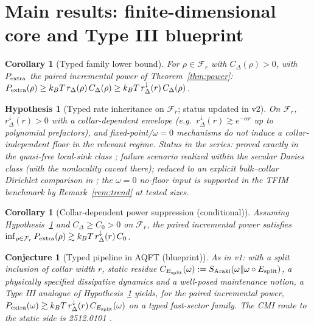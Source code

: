 \documentclass[11pt]{article}
\newtheorem{corollary}[theorem]{Corollary}
\newtheorem{hypothesis}[theorem]{Hypothesis}
\newtheorem{conjecture}[theorem]{Conjecture}
\theoremstyle{remark}
\begin{document}
\section{Main results: finite-dimensional core and Type III blueprint}
\begin{corollary}[Typed family lower bound]
For $\rho \in \mathcal{F}_r$ with $C_\Delta(\rho) > 0$, with
$P_{\rm extra}$ the \emph{paired} incremental power of
Theorem~\ref{thm:power}:
$P_{\rm extra}(\rho) \ge k_B T\, r_\Delta(\rho)\, C_\Delta(\rho) \ge
k_B T\, r^\downarrow_\Delta(r)\, C_\Delta(\rho)$.
\end{corollary}
\begin{hypothesis}[Typed rate inheritance on $\mathcal{F}_r$; status
updated in v2]
\label{hyp:rip}
On $\mathcal{F}_r$, $r^\downarrow_\Delta(r) > 0$ with a collar-dependent
envelope (e.g.\ $r^\downarrow_\Delta(r) \gtrsim e^{-\alpha r}$ up to
polynomial prefactors), and fixed-point/$\omega = 0$ mechanisms do not
induce a collar-independent floor in the relevant regime. \emph{Status in
the series:} proved exactly in the quasi-free local-sink class
\cite{S0064}; failure scenario realized within the secular Davies class
\cite{S0070} (with the nonlocality caveat there); reduced to an explicit
bulk--collar Dirichlet comparison in \cite{S0020}; the $\omega = 0$
no-floor input is supported in the TFIM benchmark by
Remark~\ref{rem:trend} at tested sizes.
\end{hypothesis}
\begin{corollary}[Collar-dependent power suppression (conditional)]
Assuming Hypothesis~\ref{hyp:rip} and $C_\Delta \ge C_0 > 0$ on
$\mathcal{F}_r$, the paired incremental power satisfies
$\inf_{\rho \in \mathcal{F}_r} P_{\rm extra}(\rho)
\gtrsim k_B T\, r^\downarrow_\Delta(r)\, C_0$.
\end{corollary}
\begin{conjecture}[Typed pipeline in AQFT (blueprint)]
As in v1: with a split inclusion of collar width $r$, static residue
$C_{E_{\rm split}}(\omega) := S_{\rm Araki}(\omega\|\omega \circ
E_{\rm split})$, a physically specified dissipative dynamics and a
well-posed maintenance notion, a Type III analogue of
Hypothesis~\ref{hyp:rip} yields, for the paired incremental power,
$P_{\rm extra}(\omega) \gtrsim k_B T\,
r^\downarrow_\Delta(r)\, C_{E_{\rm split}}(\omega)$ on a typed fast-sector
family. The CMI route to the static side is 2512.0101 \cite{S0101}.
\end{conjecture}
\end{document}
